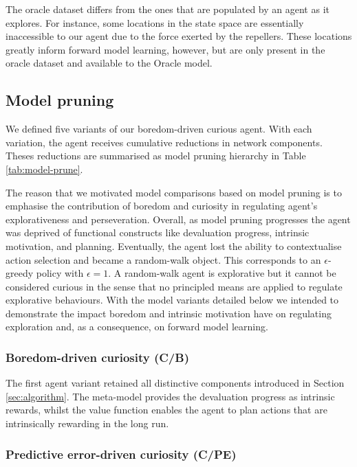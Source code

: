\documentclass[utf8]{frontiersSCNS}
\begin{document}
The oracle dataset differs from the ones that are populated by an agent as it explores. For instance, some locations in the state space are essentially inaccessible to our agent due to the force exerted by the repellers. These locations greatly inform forward model learning, however, but are only present in the oracle dataset and available to the Oracle model. %


\subsection{Model pruning} \label{subsec:mod-prune}

We defined five variants of our boredom-driven curious agent. With each variation, the agent receives cumulative reductions in network components. Theses reductions are summarised as model pruning hierarchy in Table \ref{tab:model-prune}. 

The reason that we motivated model comparisons based on model pruning is to emphasise the contribution of boredom and curiosity in regulating agent's explorativeness and perseveration. Overall, as model pruning progresses the agent was deprived of functional constructs like devaluation progress, intrinsic motivation, and planning. Eventually, the agent lost the ability to contextualise action selection and became a random-walk object. This corresponds to an $\epsilon$-greedy policy with $\epsilon=1$. A random-walk agent is explorative but it cannot be considered curious in the sense that no principled means are applied to regulate explorative behaviours. With the model variants detailed below we intended to demonstrate the impact boredom and intrinsic motivation have on regulating exploration and, as a consequence, on forward model learning.

\subsubsection{Boredom-driven curiosity (C/B)}

The first agent variant retained all distinctive components introduced in Section \ref{sec:algorithm}. The meta-model provides the devaluation progress as intrinsic rewards, whilst the value function enables the agent to plan actions that are intrinsically rewarding in the long run.

\subsubsection{Predictive error-driven curiosity (C/PE)}
\end{document}
